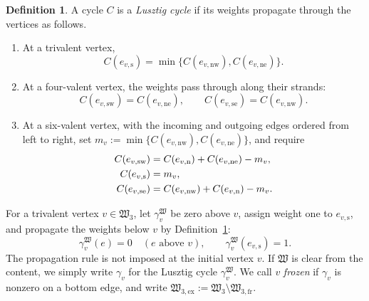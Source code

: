 \documentclass[12pt, reqno]{amsart}
\theoremstyle{plain}
\theoremstyle{definition}
\newtheorem{definition}[theorem]{Definition}
\numberwithin{equation}{section}
\begin{document}
\begin{definition}\label{def:Lusztig-cycle}
    A cycle \(C\) is a \emph{Lusztig cycle} if its weights propagate
    through the vertices as follows.
    \begin{enumerate}
        \item At a trivalent vertex,
        \begin{equation}\label{eq:Lusztig-rule-trivalent}
            C(e_{v,\mathrm s})
            =\min\{C(e_{v,\mathrm{nw}}),C(e_{v,\mathrm{ne}})\}.
        \end{equation}
        \item At a four-valent vertex, the weights pass through along
        their strands:
        \begin{equation}\label{eq:Lusztig-rule-four-valent}
            C(e_{v,\mathrm{sw}})=C(e_{v,\mathrm{ne}}),
            \qquad
            C(e_{v,\mathrm{se}})=C(e_{v,\mathrm{nw}}).
        \end{equation}
        \item At a six-valent vertex, with the incoming and outgoing
        edges ordered from left to right, set
        \(m_v:=\min\{C(e_{v,\mathrm{nw}}),C(e_{v,\mathrm{ne}})\}\),
        and require
        \begin{align}
            C(e_{v,\mathrm{sw}})
            &=C(e_{v,\mathrm n})+C(e_{v,\mathrm{ne}})-m_v,
            \notag\\
            C(e_{v,\mathrm s})&=m_v,
            \label{eq:Lusztig-rule-six-valent}\\
            C(e_{v,\mathrm{se}})
            &=C(e_{v,\mathrm{nw}})+C(e_{v,\mathrm n})-m_v.
            \notag
        \end{align}
    \end{enumerate}
\end{definition}

For a trivalent vertex \(v\in\mathfrak W_3\), let \(\gamma_v^{\mathfrak W}\) be
zero above \(v\), assign weight one to \(e_{v,\mathrm s}\), and
propagate the weights below \(v\) by Definition~\ref{def:Lusztig-cycle}:
\begin{equation}\label{eq:Lusztig-cycle-at-v}
    \gamma_v^{\mathfrak W}(e)=0\quad(e\text{ above }v),
    \qquad
    \gamma_v^{\mathfrak W}(e_{v,\mathrm s})=1.
\end{equation}
The propagation rule is not imposed at the initial vertex \(v\). If $\mathfrak W$ is clear from the content, we simply write $\gamma_v$ for the Lusztig cycle $\gamma_v^{\mathfrak W}$.
We call \(v\) \emph{frozen} if \(\gamma_v\) is nonzero on a bottom
edge, and write
\(
    \mathfrak W_{3,\mathrm{ex}}
    :=\mathfrak W_3\setminus\mathfrak W_{3,\mathrm{fr}}.
\)
\end{document}
